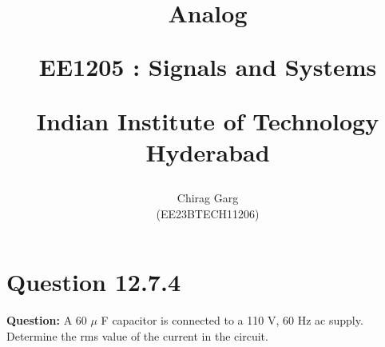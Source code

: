 \documentclass[journal,12pt,twocolumn]{IEEEtran}
\theoremstyle{remark}
\begin{document}
%






\title{
Analog 

\large{EE1205 : Signals and Systems}

Indian Institute of Technology Hyderabad
}
\author{Chirag Garg

(EE23BTECH11206)
}	





\maketitle

\newpage



\bigskip

\renewcommand{\thefigure}{\theenumi}
\renewcommand{\thetable}{\theenumi}


\section{Question 12.7.4}
\vspace{0.5cm}

\textbf{Question:} A 60 $\mu$ F capacitor is connected to a 110 V, 60 Hz ac supply. Determine
the rms value of the current in the circuit.
\end{document}
